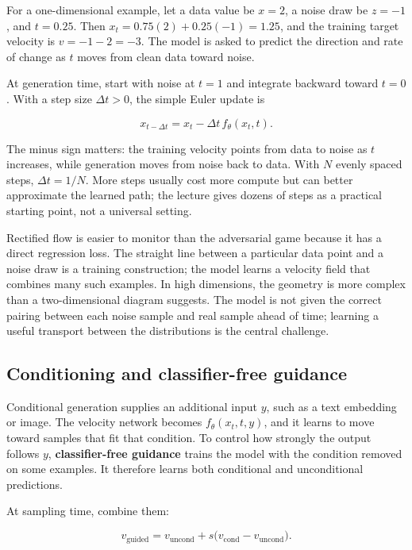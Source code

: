 For a one-dimensional example, let a data value be \(x=2\), a noise draw be \(z=-1\), and \(t=0.25\). Then \(x_t=0.75(2)+0.25(-1)=1.25\), and the training target velocity is \(v=-1-2=-3\). The model is asked to predict the direction and rate of change as \(t\) moves from clean data toward noise.

At generation time, start with noise at \(t=1\) and integrate backward toward \(t=0\). With a step size \(\Delta t>0\), the simple Euler update is

\[
x_{t-\Delta t}=x_t-\Delta t\,f_\theta(x_t,t).
\]

The minus sign matters: the training velocity points from data to noise as \(t\) increases, while generation moves from noise back to data. With \(N\) evenly spaced steps, \(\Delta t=1/N\). More steps usually cost more compute but can better approximate the learned path; the lecture gives dozens of steps as a practical starting point, not a universal setting.

Rectified flow is easier to monitor than the adversarial game because it has a direct regression loss. The straight line between a particular data point and a noise draw is a training construction; the model learns a velocity field that combines many such examples. In high dimensions, the geometry is more complex than a two-dimensional diagram suggests. The model is not given the correct pairing between each noise sample and real sample ahead of time; learning a useful transport between the distributions is the central challenge.

\subsection{Conditioning and classifier-free guidance}\label{04-visual-computing-ii-ch031-conditioning-and-classifier-free-guidance}

\hypertarget{04-visual-computing-ii-ch031-conditioning-and-classifier-free-guidance}{}

Conditional generation supplies an additional input \(y\), such as a text embedding or image. The velocity network becomes \(f_\theta(x_t,t,y)\), and it learns to move toward samples that fit that condition. To control how strongly the output follows \(y\), \textbf{classifier-free guidance} trains the model with the condition removed on some examples. It therefore learns both conditional and unconditional predictions.

At sampling time, combine them:

\[
v_{\text{guided}}=v_{\text{uncond}}+s\big(v_{\text{cond}}-v_{\text{uncond}}\big).
\]

